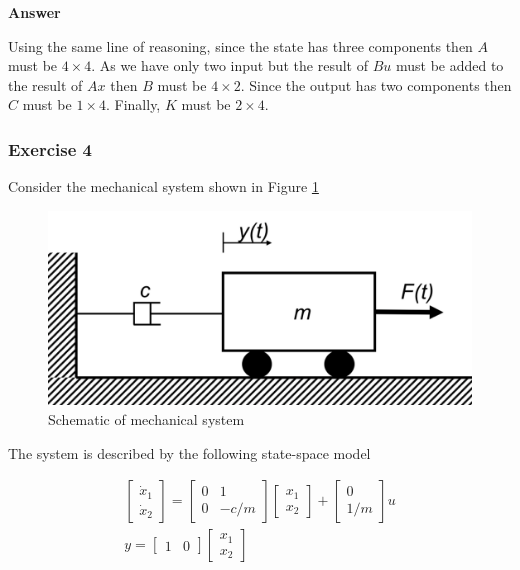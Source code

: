 \textbf{Answer}

Using the same line of reasoning, since the state has three components then $A$ must be $4\times 4$. As we have only two input but the result of $Bu$ must be added to the result of $Ax$ then $B$ must be $4\times 2$. Since the output has two components then $C$ must be $1\times 4$. Finally, $K$ must be $2\times 4$.

\subsubsection{Exercise 4}

Consider the mechanical system shown in Figure \ref{Mechanical_system_3_1_1_ex_4} 

\begin{figure}[!htb]
\begin{center}
\includegraphics[scale=0.280]{img/state_feedback/Mechanical_system_3_1_1_ex_4.png}
\end{center}
\caption{Schematic of mechanical system}
\label{Mechanical_system_3_1_1_ex_4}
\end{figure}

The system is described by the following state-space model

\begin{eqnarray}
\begin{bmatrix}
 \dot{x}_1 \\
 \dot{x}_2 
\end{bmatrix} =  
\begin{bmatrix}
 0 & 1 \\
 0 & -c/m
\end{bmatrix}
\begin{bmatrix}
 x_1 \\
 x_2  
\end{bmatrix}+
\begin{bmatrix}
 0 \\
 1/m  
\end{bmatrix}u \\
y =
\begin{bmatrix}
 1 & 0 
\end{bmatrix}
\begin{bmatrix}
 x_1 \\
 x_2  
\end{bmatrix}
\end{eqnarray}

